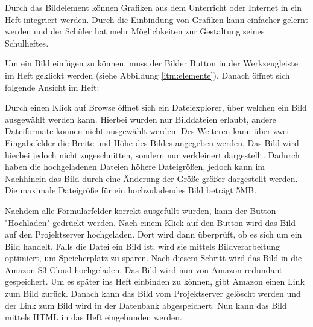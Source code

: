 \label{sec:bildelement}
Durch das Bildelement können Grafiken aus dem Unterricht oder Internet in ein Heft integriert werden. Durch die Einbindung von Grafiken kann einfacher gelernt werden und der Schüler hat mehr Möglichkeiten zur Gestaltung seines Schulheftes.

Um ein Bild einfügen zu können, muss der Bilder Button in der Werkzeugleiste im Heft geklickt werden (siehe Abbildung \ref{itm:elemente}). Danach öffnet sich folgende Ansicht im Heft:


Durch einen Klick auf Browse öffnet sich ein Dateiexplorer, über welchen ein Bild ausgewählt werden kann. Hierbei wurden nur Bilddateien erlaubt, andere Dateiformate können nicht ausgewählt werden. Des Weiteren kann über zwei Eingabefelder die Breite und Höhe des Bildes angegeben werden. Das Bild wird hierbei jedoch nicht zugeschnitten, sondern nur verkleinert dargestellt. Dadurch haben die hochgeladenen Dateien höhere Dateigrößen, jedoch kann im Nachhinein das Bild durch eine Änderung der Größe größer dargestellt werden. Die maximale Dateigröße für ein hochzuladendes Bild beträgt 5MB.

Nachdem alle Formularfelder korrekt ausgefüllt wurden, kann der Button "Hochladen" gedrückt werden. Nach einem Klick auf den Button wird das Bild auf den Projektserver hochgeladen. Dort wird dann überprüft, ob es sich um ein Bild handelt. Falls die Datei ein Bild ist, wird sie mittels Bildverarbeitung optimiert, um Speicherplatz zu sparen. Nach diesem Schritt wird das Bild in die Amazon S3 Cloud hochgeladen. Das Bild wird nun von Amazon redundant gespeichert. Um es später ins Heft einbinden zu können, gibt Amazon einen Link zum Bild zurück. Danach kann das Bild vom Projektserver gelöscht werden und der Link zum Bild wird in der Datenbank abgespeichert. Nun kann das Bild mittels HTML in das Heft eingebunden werden. \cite{AWSS3} 